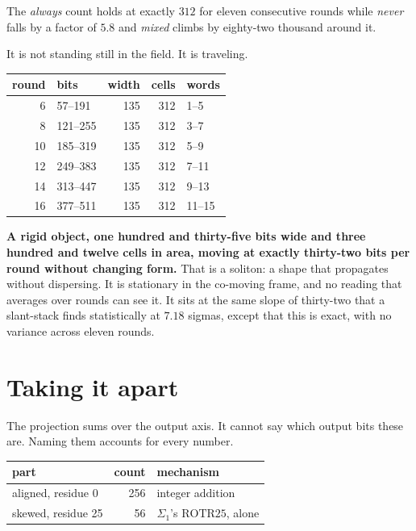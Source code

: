 The \emph{always} count holds at exactly \(312\) for eleven consecutive rounds while \emph{never}
falls by a factor of \(5.8\) and \emph{mixed} climbs by eighty-two thousand around it.

It is not standing still in the field. It is traveling.

\begin{center}
\begin{tabular}{rlrrl}
\toprule
round & bits & width & cells & words \\
\midrule
6 & 57--191 & 135 & 312 & 1--5 \\
8 & 121--255 & 135 & 312 & 3--7 \\
10 & 185--319 & 135 & 312 & 5--9 \\
12 & 249--383 & 135 & 312 & 7--11 \\
14 & 313--447 & 135 & 312 & 9--13 \\
16 & 377--511 & 135 & 312 & 11--15 \\
\bottomrule
\end{tabular}
\end{center}

\textbf{A rigid object, one hundred and thirty-five bits wide and three hundred and twelve cells in
area, moving at exactly thirty-two bits per round without changing form.} That is a soliton: a shape
that propagates without dispersing. It is stationary in the co-moving frame, and no reading that
averages over rounds can see it. It sits at the same slope of thirty-two that a slant-stack finds
statistically at \(7.18\) sigmas, except that this is exact, with no variance across eleven rounds.

\section{Taking it apart}

The projection sums over the output axis. It cannot say which output bits these are. Naming them
accounts for every number.

\begin{center}
\begin{tabular}{lrl}
\toprule
part & count & mechanism \\
\midrule
aligned, residue 0 & 256 & integer addition \\
skewed, residue 25 & 56 & \(\Sigma_1\)'s \(\mathrm{ROTR}25\), alone \\
\bottomrule
\end{tabular}
\end{center}

